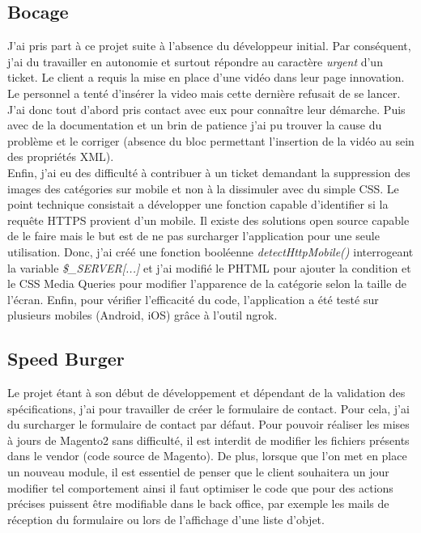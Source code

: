 \documentclass[12pt, a4paper, twoside]{report}
\begin{document}
\subsection{Bocage}

J'ai pris part à ce projet suite à l'absence du développeur initial. Par conséquent, j'ai du travailler en autonomie et surtout répondre au caractère \textit{urgent} d'un ticket. Le client a requis la mise en place d'une vidéo dans leur page innovation. Le personnel a tenté d'insérer la video mais cette dernière refusait de se lancer. J'ai donc tout d'abord pris contact avec eux pour connaître leur démarche. Puis avec de la documentation et un brin de patience j'ai pu trouver la cause du problème et le corriger (absence du bloc permettant l'insertion de la vidéo au sein des propriétés XML). \\

Enfin, j'ai eu des difficulté à contribuer à un ticket demandant la suppression des images des catégories sur mobile et non à la dissimuler avec du simple CSS. Le point technique consistait a développer une fonction capable d'identifier si la requête HTTPS provient d'un mobile. Il existe des solutions open source capable de le faire mais le but est de ne pas surcharger l'application pour une seule utilisation. Donc, j'ai créé une fonction booléenne \textit{detectHttpMobile()} interrogeant la variable \textit{\$\_SERVER[...]} et j'ai modifié le PHTML pour ajouter la condition et le CSS Media Queries pour modifier l'apparence de la catégorie selon la taille de l'écran. Enfin, pour vérifier l'efficacité du code, l'application a été testé sur plusieurs mobiles (Android, iOS) grâce à l'outil ngrok.

\subsection{Speed Burger}

Le projet étant à son début de développement et dépendant de la validation des spécifications, j'ai pour travailler de créer le formulaire de contact. Pour cela, j'ai du surcharger le formulaire de contact par défaut. Pour pouvoir réaliser les mises à jours de Magento2 sans difficulté, il est interdit de modifier les fichiers présents dans le vendor (code source de Magento). De plus, lorsque que l'on met en place un nouveau module, il est essentiel de penser que le client souhaitera un jour modifier tel comportement ainsi il faut optimiser le code que pour des actions précises puissent être modifiable dans le back office, par exemple les mails de réception du formulaire ou lors de l'affichage d'une liste d'objet. \\
\end{document}
